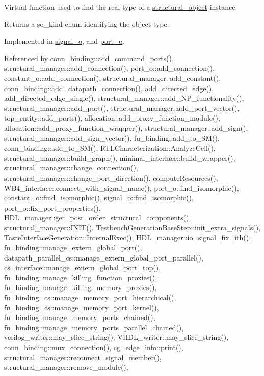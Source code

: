 Virtual function used to find the real type of a \hyperlink{classstructural__object}{structural\+\_\+object} instance. 

\begin{DoxyReturn}{Returns}
a so\+\_\+kind enum identifying the object type. 
\end{DoxyReturn}


Implemented in \hyperlink{classsignal__o_a4407c1e66d004e623ccdc8b57d5fb385}{signal\+\_\+o}, and \hyperlink{structport__o_ab52b545359c3b6c24236f5328a49b3c5}{port\+\_\+o}.



Referenced by conn\+\_\+binding\+::add\+\_\+command\+\_\+ports(), structural\+\_\+manager\+::add\+\_\+connection(), port\+\_\+o\+::add\+\_\+connection(), constant\+\_\+o\+::add\+\_\+connection(), structural\+\_\+manager\+::add\+\_\+constant(), conn\+\_\+binding\+::add\+\_\+datapath\+\_\+connection(), add\+\_\+directed\+\_\+edge(), add\+\_\+directed\+\_\+edge\+\_\+single(), structural\+\_\+manager\+::add\+\_\+\+N\+P\+\_\+functionality(), structural\+\_\+manager\+::add\+\_\+port(), structural\+\_\+manager\+::add\+\_\+port\+\_\+vector(), top\+\_\+entity\+::add\+\_\+ports(), allocation\+::add\+\_\+proxy\+\_\+function\+\_\+module(), allocation\+::add\+\_\+proxy\+\_\+function\+\_\+wrapper(), structural\+\_\+manager\+::add\+\_\+sign(), structural\+\_\+manager\+::add\+\_\+sign\+\_\+vector(), fu\+\_\+binding\+::add\+\_\+to\+\_\+\+S\+M(), conn\+\_\+binding\+::add\+\_\+to\+\_\+\+S\+M(), R\+T\+L\+Characterization\+::\+Analyze\+Cell(), structural\+\_\+manager\+::build\+\_\+graph(), minimal\+\_\+interface\+::build\+\_\+wrapper(), structural\+\_\+manager\+::change\+\_\+connection(), structural\+\_\+manager\+::change\+\_\+port\+\_\+direction(), compute\+Resources(), W\+B4\+\_\+interface\+::connect\+\_\+with\+\_\+signal\+\_\+name(), port\+\_\+o\+::find\+\_\+isomorphic(), constant\+\_\+o\+::find\+\_\+isomorphic(), signal\+\_\+o\+::find\+\_\+isomorphic(), port\+\_\+o\+::fix\+\_\+port\+\_\+properties(), H\+D\+L\+\_\+manager\+::get\+\_\+post\+\_\+order\+\_\+structural\+\_\+components(), structural\+\_\+manager\+::\+I\+N\+I\+T(), Testbench\+Generation\+Base\+Step\+::init\+\_\+extra\+\_\+signals(), Taste\+Interface\+Generation\+::\+Internal\+Exec(), H\+D\+L\+\_\+manager\+::io\+\_\+signal\+\_\+fix\+\_\+ith(), fu\+\_\+binding\+::manage\+\_\+extern\+\_\+global\+\_\+port(), datapath\+\_\+parallel\+\_\+cs\+::manage\+\_\+extern\+\_\+global\+\_\+port\+\_\+parallel(), cs\+\_\+interface\+::manage\+\_\+extern\+\_\+global\+\_\+port\+\_\+top(), fu\+\_\+binding\+::manage\+\_\+killing\+\_\+function\+\_\+proxies(), fu\+\_\+binding\+::manage\+\_\+killing\+\_\+memory\+\_\+proxies(), fu\+\_\+binding\+\_\+cs\+::manage\+\_\+memory\+\_\+port\+\_\+hierarchical(), fu\+\_\+binding\+\_\+cs\+::manage\+\_\+memory\+\_\+port\+\_\+kernel(), fu\+\_\+binding\+::manage\+\_\+memory\+\_\+ports\+\_\+chained(), fu\+\_\+binding\+::manage\+\_\+memory\+\_\+ports\+\_\+parallel\+\_\+chained(), verilog\+\_\+writer\+::may\+\_\+slice\+\_\+string(), V\+H\+D\+L\+\_\+writer\+::may\+\_\+slice\+\_\+string(), conn\+\_\+binding\+::mux\+\_\+connection(), cg\+\_\+edge\+\_\+info\+::print(), structural\+\_\+manager\+::reconnect\+\_\+signal\+\_\+member(), structural\+\_\+manager\+::remove\+\_\+module(), 
